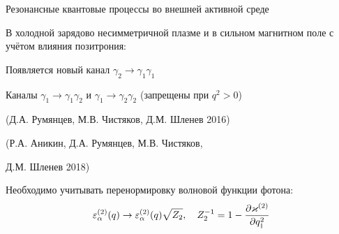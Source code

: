 \documentclass{beamer}
\def\mprl{\mbox{\tiny $\|$}}
\begin{document}
\begin{frame}{Резонансные квантовые процессы во внешней активной среде}
\begin{center}
В холодной зарядово несимметричной плазме и в сильном магнитном поле с учётом влияния позитрония:
\vspace*{3mm}

Появляется \alert{новый канал} $\gamma_2\to\gamma_1 \gamma_1$

Каналы $\gamma_1\to\gamma_1 \gamma_2$ и $\gamma_1\to\gamma_2 \gamma_2$ (запрещены при $q^2>0$)

\vspace*{3mm}

(Д.А. Румянцев, М.В. Чистяков, Д.М. Шленев 2016)


(Р.А. Аникин, Д.А. Румянцев, М.В. Чистяков, 

Д.М. Шленев 2018)

\vspace*{3mm}

Необходимо учитывать перенормировку волновой функции фотона:
$$\varepsilon_{\alpha}^{(2)} (q) \to \varepsilon_{\alpha}^{(2)} (q) \sqrt{Z_2}, \quad Z_2^{-1} = 1 - \frac{\partial\varkappa^{(2)}}{\partial q_{\mprl}^2}$$
\end{center}
\end{frame}
\end{document}

